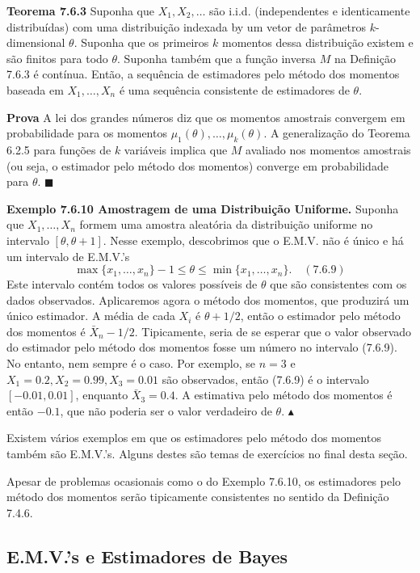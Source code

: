 \textbf{Teorema 7.6.3} Suponha que $X_1, X_2, \dots$ são i.i.d. (independentes e identicamente distribuídas) com uma distribuição indexada by um vetor de parâmetros $k$-dimensional $\theta$. Suponha que os primeiros $k$ momentos dessa distribuição existem e são finitos para todo $\theta$. Suponha também que a função inversa $M$ na Definição 7.6.3 é contínua. Então, a sequência de estimadores pelo método dos momentos baseada em $X_1, \dots, X_n$ é uma sequência consistente de estimadores de $\theta$.

\textbf{Prova} A lei dos grandes números diz que os momentos amostrais convergem em probabilidade para os momentos $\mu_1(\theta), \dots, \mu_k(\theta)$. A generalização do Teorema 6.2.5 para funções de $k$ variáveis implica que $M$ avaliado nos momentos amostrais (ou seja, o estimador pelo método dos momentos) converge em probabilidade para $\theta$. $\blacksquare$

\textbf{Exemplo 7.6.10 Amostragem de uma Distribuição Uniforme.} Suponha que $X_1, \dots, X_n$ formem uma amostra aleatória da distribuição uniforme no intervalo $[\theta, \theta+1]$. Nesse exemplo, descobrimos que o E.M.V. não é único e há um intervalo de E.M.V.'s
$$ \max\{x_1, \dots, x_n\} - 1 \le \theta \le \min\{x_1, \dots, x_n\}. \quad (7.6.9) $$
Este intervalo contém todos os valores possíveis de $\theta$ que são consistentes com os dados observados. Aplicaremos agora o método dos momentos, que produzirá um único estimador. A média de cada $X_i$ é $\theta + 1/2$, então o estimador pelo método dos momentos é $\bar{X}_n - 1/2$. Tipicamente, seria de se esperar que o valor observado do estimador pelo método dos momentos fosse um número no intervalo (7.6.9). No entanto, nem sempre é o caso. Por exemplo, se $n=3$ e $X_1=0.2, X_2=0.99, X_3=0.01$ são observados, então (7.6.9) é o intervalo $[-0.01, 0.01]$, enquanto $\bar{X}_3 = 0.4$. A estimativa pelo método dos momentos é então $-0.1$, que não poderia ser o valor verdadeiro de $\theta$. $\blacktriangle$

Existem vários exemplos em que os estimadores pelo método dos momentos também são E.M.V.'s. Alguns destes são temas de exercícios no final desta seção.

Apesar de problemas ocasionais como o do Exemplo 7.6.10, os estimadores pelo método dos momentos serão tipicamente consistentes no sentido da Definição 7.4.6.

\subsection*{E.M.V.'s e Estimadores de Bayes}

